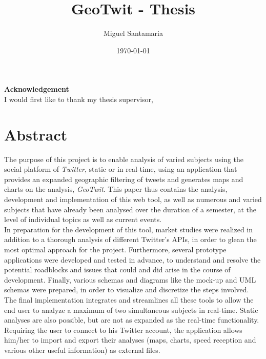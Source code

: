 \documentclass[a4paper,11pt]{report}
\title{GeoTwit - Thesis}
\author{Miguel Santamaria}
\date{\today}
\begin{document}
\maketitle

\thispagestyle{empty}
\vspace*{8cm}
\begin{center}
    \textbf{Acknowledgement}\\
    \bigskip
    I would first like to thank my thesis supervisor, 
\end{center}

\setcounter{page}{0}

\chapter*{Abstract}
The purpose of this project is to enable analysis of varied subjects using the social platform of \emph{Twitter}, static or in real-time, using an application that provides an expanded geographic filtering of tweets and generates maps and charts on the analysis, \emph{GeoTwit}. This paper thus contains the analysis, development and implementation of this web tool, as well as numerous and varied subjects that have already been analysed over the duration of a semester, at the level of individual topics as well as current events.\\
In preparation for the development of this tool, market studies were realized in addition to a thorough analysis of different Twitter's APIs, in order to glean the most optimal approach for the project. Furthermore, several prototype applications were developed and tested in advance, to understand and resolve the potential roadblocks and issues that could and did arise in the course of development. Finally, various schemas and diagrams like the mock-up and UML schemas were prepared, in order to visualize and discretize the steps involved. The final implementation integrates and streamlines all these tools to allow the end user to analyze a maximum of two simultaneous subjects in real-time. Static analyses are also possible, but are not as expanded as the real-time functionality. Requiring the user to connect to his Twitter account, the application allows him/her to import and export their analyses (maps, charts, speed reception and various other useful information) as external files.

\tableofcontents
\newpage
\thispagestyle{empty}
~
\newpage
\end{document}
